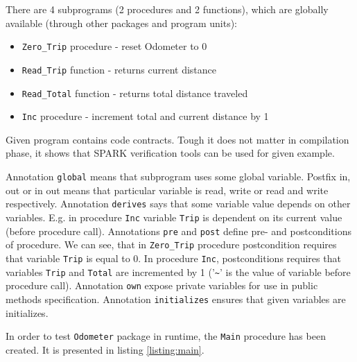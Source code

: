There are 4 subprograms (2 procedures and 2 functions), which are globally available (through other packages and program units):
\begin{itemize}
    \item \lstinline{Zero_Trip} procedure - reset Odometer to 0
    \item \lstinline{Read_Trip} function - returns current distance
    \item \lstinline{Read_Total} function - returns total distance traveled
    \item \lstinline{Inc} procedure - increment total and current distance by 1
\end{itemize}

Given program contains code contracts. Tough it does not matter in compilation phase, it shows that SPARK verification tools can be used for given example. 

Annotation \lstinline{global} means that subprogram uses some global variable. Postfix in, out or in out means that particular variable is read, write or read and write respectively. Annotation \lstinline{derives} says that some variable value depends on other variables. E.g. in procedure \lstinline{Inc} variable \lstinline{Trip} is dependent on its current value (before procedure call). Annotations \lstinline{pre} and \lstinline{post} define pre- and postconditions of procedure. We can see, that in \lstinline{Zero_Trip} procedure postcondition requires that variable \lstinline{Trip} is equal to 0. In procedure \lstinline{Inc}, postconditions requires that variables \lstinline{Trip} and \lstinline{Total} are incremented by 1 ('\lstinline{~}' is the value of variable before procedure call). Annotation \lstinline{own} expose private variables for use in public methods specification. Annotation \lstinline{initializes} ensures that given variables are initializes. 

In order to test \lstinline{Odometer} package in runtime, the \lstinline{Main} procedure has been created. It is presented in listing \ref{listing:main}.

